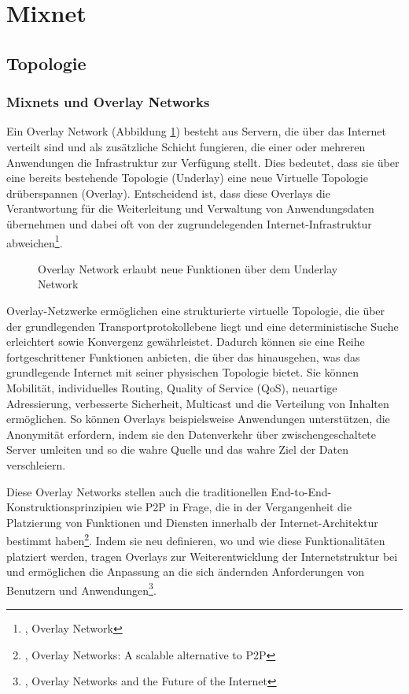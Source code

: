 \section{Mixnet}
\label{chap:mixnet}

\subsection{Topologie}
\label{chap:mixnet_topology}

\subsubsection{Mixnets und Overlay Networks}
\label{chap:mixnet_overlay}

Ein Overlay Network (Abbildung \ref{imgs:overlay_network}) besteht aus Servern, die über das Internet verteilt sind und als zusätzliche Schicht fungieren, die einer oder mehreren Anwendungen die Infrastruktur zur Verfügung stellt. Dies bedeutet, dass sie über eine bereits bestehende Topologie (Underlay) eine neue Virtuelle Topologie drüberspannen (Overlay). Entscheidend ist, dass diese Overlays die Verantwortung für die Weiterleitung und Verwaltung von Anwendungsdaten übernehmen und dabei oft von der zugrundelegenden Internet-Infrastruktur abweichen\footnote{\cite{OverlayNetwork}, Overlay Network}.

\begin{figure}[h!]
    \centering
    
    \caption{Overlay Network erlaubt neue Funktionen über dem Underlay Network}
    \label{imgs:overlay_network}
\end{figure}

Overlay-Netzwerke ermöglichen eine strukturierte virtuelle Topologie, die über der grundlegenden Transportprotokollebene liegt und eine deterministische Suche erleichtert sowie Konvergenz gewährleistet. Dadurch können sie eine Reihe fortgeschrittener Funktionen anbieten, die über das hinausgehen, was das grundlegende Internet mit seiner physischen Topologie bietet. Sie können Mobilität, individuelles Routing, Quality of Service (QoS), neuartige Adressierung, verbesserte Sicherheit, Multicast und die Verteilung von Inhalten ermöglichen. So können Overlays beispielsweise Anwendungen unterstützen, die Anonymität erfordern, indem sie den Datenverkehr über zwischengeschaltete Server umleiten und so die wahre Quelle und das wahre Ziel der Daten verschleiern.

Diese Overlay Networks stellen auch die traditionellen End-to-End-Konstruktionsprinzipien wie P2P in Frage, die in der Vergangenheit die Platzierung von Funktionen und Diensten innerhalb der Internet-Architektur bestimmt haben\footnote{\cite{AlternativeToP2P}, Overlay Networks: A scalable alternative to P2P}. Indem sie neu definieren, wo und wie diese Funktionalitäten platziert werden, tragen Overlays zur Weiterentwicklung der Internetstruktur bei und ermöglichen die Anpassung an die sich ändernden Anforderungen von Benutzern und Anwendungen\footnote{\cite{FutureOfTheInternet}, Overlay Networks and the Future of the Internet}.

